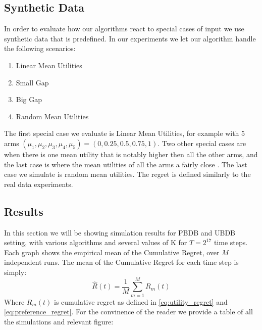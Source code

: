 \documentclass{llncs}
\begin{document}
\subsection{Synthetic Data}
In order to evaluate how our algorithms react to special cases of input we use synthetic data that is predefined.
In our experiments we let our algorithm handle the following scenarios:
\begin{enumerate}
\item Linear Mean Utilities
\item Small Gap
\item Big Gap
\item Random Mean Utilities
\end{enumerate}
The first special case we evaluate is Linear Mean Utilities, for example with 5 arms $(\mu_1, \mu_2, \mu_3, \mu_4, \mu_5) = (0, 0.25, 0.5, 0.75, 1)$.
Two other special cases are when there is one mean utility that is notably higher then all the other arms, and the last case is where the mean utilities of all the arms a fairly close .
The last case we simulate is random mean utilities.
The regret is defined similarly to the real data experiments.

\newpage
\subsection{Results}
In this section we will be showing simulation results for PBDB and UBDB setting, with various algorithms and several values of K for $T = 2^{17}$ time steps. 
Each graph shows the empirical mean of the Cumulative Regret, over $M$ independent runs.
The mean of the Cumulative Regret for each time step is simply:
	\begin{equation}
	 \hat{R}(t) = \frac{1}{M}\sum_{m=1}^{M} R_m(t)
	\end{equation}
Where $R_m(t)$ is cumulative regret as defined in \eqref{eq:utility_regret} and \eqref{eq:preference_regret}.
For the convinence of the reader we provide a table of all the simulations and relevant figure:
\end{document}
